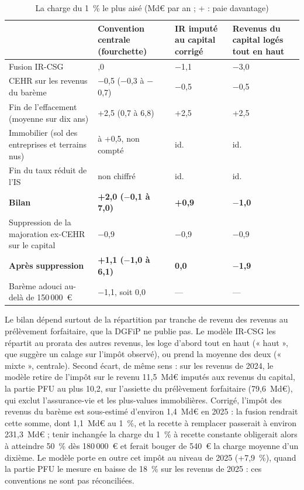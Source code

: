 \begin{table}[!htbp]\centering\scriptsize
\caption{La charge du 1~\% le plus aisé (Md€ par an ; + : paie davantage)}\label{tab:ens_haut}
\begin{tabularx}{\linewidth}{@{}>{\raggedright\arraybackslash}X>{\raggedright\arraybackslash}p{3.2cm}>{\raggedright\arraybackslash}p{2.6cm}>{\raggedright\arraybackslash}p{2.6cm}@{}}
\toprule
 & Convention centrale (fourchette) & IR imputé au capital corrigé & Revenus du capital logés tout en haut \\
\midrule
Fusion IR-CSG & 0,0 & $-$1,1 & $-$3,0 \\
CEHR sur les revenus du barème & $-$0,5 ($-$0,3 à $-$0,7) & $-$0,5 & $-$0,5 \\
Fin de l'effacement (moyenne sur dix ans) & +2,5 (0,7 à 6,8) & +2,5 & +2,5 \\
Immobilier (sol des entreprises et terrains nus) & 0 à +0,5, non compté & id. & id. \\
Fin du taux réduit de l'IS & non chiffré & id. & id. \\
\textbf{Bilan} & \textbf{+2,0 ($-$0,1 à 7,0)} & \textbf{+0,9} & \textbf{$-$1,0} \\
Suppression de la majoration ex-CEHR sur le capital & $-$0,9 & $-$0,9 & $-$0,9 \\
\textbf{Après suppression} & \textbf{+1,1 ($-$1,0 à 6,1)} & \textbf{0,0} & \textbf{$-$1,9} \\
Barème adouci au-delà de 150\,000~€ & $-$1,1, soit 0,0 & --- & --- \\
\bottomrule
\end{tabularx}
\par{}
\end{table}

Le bilan dépend surtout de la répartition par tranche de revenu des revenus au prélèvement forfaitaire, que la DGFiP ne
publie pas. Le modèle IR-CSG les répartit au prorata des autres revenus, les loge d'abord tout en haut (« haut », que
suggère un calage sur l'impôt observé), ou prend la moyenne des deux (« mixte », centrale). Second écart, de même sens :
sur les revenus de 2024, le modèle retire de l'impôt sur le revenu 11,5~Md€ imputés aux revenus du capital, la partie
PFU au plus 10,2, sur l'assiette du prélèvement forfaitaire (79,6~Md€), qui exclut l'assurance-vie et les plus-values
immobilières. Corrigé, l'impôt des revenus du barème est sous-estimé d'environ 1,4~Md€ en 2025 : la fusion rendrait
cette somme, dont 1,1~Md€ au 1~\%, et la recette à remplacer passerait à environ 231,3~Md€ ; tenir inchangée la charge du 1~\% à recette constante
obligerait alors à atteindre 50~\% dès 180\,000~€ et ferait bouger de 540~€ la charge moyenne d'un dixième. Le modèle porte en outre cet
impôt au niveau de 2025 (+7,9~\%), quand la partie PFU le mesure en baisse de 18~\% sur les revenus de 2025 : ces
conventions ne sont pas réconciliées.

